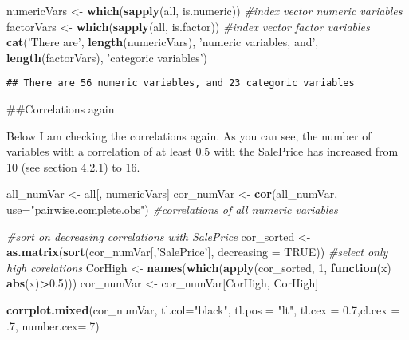 \documentclass[]{article}
\newenvironment{Shaded}{\begin{snugshade}}{\end{snugshade}}
\newcommand{\CommentTok}[1]{\textcolor[rgb]{0.56,0.35,0.01}{\textit{#1}}}
\newcommand{\ControlFlowTok}[1]{\textcolor[rgb]{0.13,0.29,0.53}{\textbf{#1}}}
\newcommand{\DataTypeTok}[1]{\textcolor[rgb]{0.13,0.29,0.53}{#1}}
\newcommand{\DecValTok}[1]{\textcolor[rgb]{0.00,0.00,0.81}{#1}}
\newcommand{\FloatTok}[1]{\textcolor[rgb]{0.00,0.00,0.81}{#1}}
\newcommand{\KeywordTok}[1]{\textcolor[rgb]{0.13,0.29,0.53}{\textbf{#1}}}
\newcommand{\NormalTok}[1]{#1}
\newcommand{\OperatorTok}[1]{\textcolor[rgb]{0.81,0.36,0.00}{\textbf{#1}}}
\newcommand{\OtherTok}[1]{\textcolor[rgb]{0.56,0.35,0.01}{#1}}
\newcommand{\StringTok}[1]{\textcolor[rgb]{0.31,0.60,0.02}{#1}}
\begin{document}
\begin{Shaded}
\begin{Highlighting}[]
\NormalTok{numericVars <-}\StringTok{ }\KeywordTok{which}\NormalTok{(}\KeywordTok{sapply}\NormalTok{(all, is.numeric)) }\CommentTok{#index vector numeric variables}
\NormalTok{factorVars <-}\StringTok{ }\KeywordTok{which}\NormalTok{(}\KeywordTok{sapply}\NormalTok{(all, is.factor)) }\CommentTok{#index vector factor variables}
\KeywordTok{cat}\NormalTok{(}\StringTok{'There are'}\NormalTok{, }\KeywordTok{length}\NormalTok{(numericVars), }\StringTok{'numeric variables, and'}\NormalTok{, }\KeywordTok{length}\NormalTok{(factorVars), }\StringTok{'categoric variables'}\NormalTok{)}
\end{Highlighting}
\end{Shaded}

\begin{verbatim}
## There are 56 numeric variables, and 23 categoric variables
\end{verbatim}

\#\#Correlations again

Below I am checking the correlations again. As you can see, the number
of variables with a correlation of at least 0.5 with the SalePrice has
increased from 10 (see section 4.2.1) to 16.

\begin{Shaded}
\begin{Highlighting}[]
\NormalTok{all_numVar <-}\StringTok{ }\NormalTok{all[, numericVars]}
\NormalTok{cor_numVar <-}\StringTok{ }\KeywordTok{cor}\NormalTok{(all_numVar, }\DataTypeTok{use=}\StringTok{"pairwise.complete.obs"}\NormalTok{) }\CommentTok{#correlations of all numeric variables}

\CommentTok{#sort on decreasing correlations with SalePrice}
\NormalTok{cor_sorted <-}\StringTok{ }\KeywordTok{as.matrix}\NormalTok{(}\KeywordTok{sort}\NormalTok{(cor_numVar[,}\StringTok{'SalePrice'}\NormalTok{], }\DataTypeTok{decreasing =} \OtherTok{TRUE}\NormalTok{))}
 \CommentTok{#select only high corelations}
\NormalTok{CorHigh <-}\StringTok{ }\KeywordTok{names}\NormalTok{(}\KeywordTok{which}\NormalTok{(}\KeywordTok{apply}\NormalTok{(cor_sorted, }\DecValTok{1}\NormalTok{, }\ControlFlowTok{function}\NormalTok{(x) }\KeywordTok{abs}\NormalTok{(x)}\OperatorTok{>}\FloatTok{0.5}\NormalTok{)))}
\NormalTok{cor_numVar <-}\StringTok{ }\NormalTok{cor_numVar[CorHigh, CorHigh]}

\KeywordTok{corrplot.mixed}\NormalTok{(cor_numVar, }\DataTypeTok{tl.col=}\StringTok{"black"}\NormalTok{, }\DataTypeTok{tl.pos =} \StringTok{"lt"}\NormalTok{, }\DataTypeTok{tl.cex =} \FloatTok{0.7}\NormalTok{,}\DataTypeTok{cl.cex =} \FloatTok{.7}\NormalTok{, }\DataTypeTok{number.cex=}\NormalTok{.}\DecValTok{7}\NormalTok{)}
\end{Highlighting}
\end{Shaded}
\end{document}
